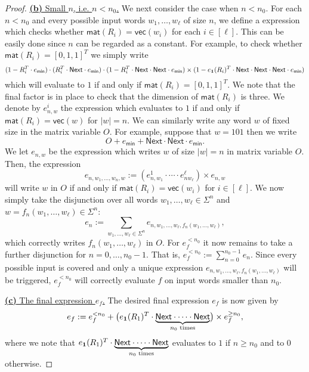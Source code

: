 \begin{proof}
\medskip
\noindent
\underline{\textbf{(b)} Small $n$, i.e. $n< n_0$.}	
We next consider the case when $n<n_0$. For each $n<n_0$ and every possible input words
    $w_1,\ldots,w_\ell$ of size $n$, we define a \langfor expression which checks whether
    $\mathsf{mat}(R_i)=\mathsf{vec}(w_i)$ for each $i\in[\ell]$. This can be easily done since $n$ 
    can be regarded as a constant. For example, to check whether $\mathsf{mat}(R_i)=[0,1,1]^T$ we simply write
    $$
    (1- R_i^T\cdot e_{\mathsf{min}})\cdot (R_i^T\cdot \mathsf{Next}\cdot e_{\mathsf{min}})\cdot (1- R_i^T\cdot \mathsf{Next}\cdot \mathsf{Next}\cdot e_{\mathsf{min}})\times (1- e_{\mathbf{1}}(R_i)^T\cdot \mathsf{Next}\cdot \mathsf{Next}\cdot \mathsf{Next}\cdot e_{\mathsf{min}})
    $$
    which will evaluate to $1$ if and only if $\mathsf{mat}(R_i)=[0,1,1]^T$. We note that the final factor is in 
    place to check that the dimension of $\mathsf{mat}(R_i)$ is three.
    We denote by
    $e_{n,w}^i$ the expression which evaluates to $1$ if and only if $\mathsf{mat}(R_i)=\mathsf{vec}(w)$
    for $|w|=n$.
    We can similarly
    write any word $w$ of fixed size in the matrix variable $O$. For example, suppose that $w=101$
    then we write 
    $$
    O+ e_{\mathsf{min}}+  \mathsf{Next}\cdot \mathsf{Next}\cdot e_{\mathsf{min}}.
    $$
    We let $e_{n,w}$ be the expression which writes $w$ of size $|w|=n$ in matrix variable $O$.
    Then, the expression
    $$
    e_{n,w_1,\ldots,w_n,w}:=(e_{n,w_1}^1\cdot\cdots\cdot e_{nw_{\ell}}^\ell)\times e_{n,w}
    $$
    will write $w$ in $O$ if and only if $\mathsf{mat}(R_i)=\mathsf{vec}(w_i)$ for $i\in[\ell]$.
    We now simply take the disjunction over all words 
    $w_1,\ldots,w_\ell\in\Sigma^n$ and $w=f_n(w_1,\ldots,w_\ell)\in\Sigma^n$:
    $$
    e_n:=\sum_{w_1,\ldots,w_\ell\in\Sigma^n} e_{n,w_1,\ldots,w_\ell,f_n(w_1,\ldots,w_\ell)},
    $$
    which correctly writes $f_n(w_1,\ldots,w_\ell)$ in $O$. For $e_f^{<n_0}$ it now remains
to take a further disjunction for $n=0,\ldots, n_0-1$. That is,
    $
    e_f^{<n_0}:=\sum_{n=0}^{n_0-1} e_n
    $.
    Since every possible input is covered and only a unique expression 
    $e_{n,w_1,\ldots,w_\ell,f_n(w_1,\ldots,w_\ell)}$ will be triggered, $e_f^{<n_0}$ will correctly
    evaluate $f$ on input words smaller than $n_0$.

\medskip
\noindent
\underline{\textbf{(c)} The final expression $e_f$.}	
 The desired final expression $e_f$ is now given by
    $$
    e_f:=e_f^{<n_0} + \bigl(e_{\mathbf{1}}(R_1)^T\cdot\underbrace{\mathsf{Next}\cdot\cdots\cdot \mathsf{Next}}_{\text{$n_0$ times}}\bigr)\times e_f^{\geq n_0},
    $$
where we note that $e_{\mathbf{1}}(R_1)^T\cdot\underbrace{\mathsf{Next}\cdot\cdots\cdot \mathsf{Next}}_{\text{$n_0$ times}}$ evaluates to $1$ if
$n\geq n_0$ and to $0$ otherwise.
\end{proof}

